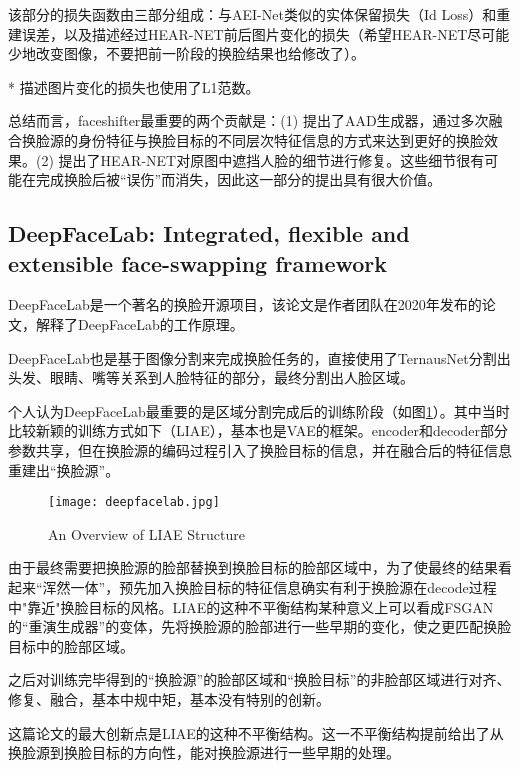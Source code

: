 \documentclass[a4paper]{article}
\begin{document}
该部分的损失函数由三部分组成：与AEI-Net类似的实体保留损失（Id Loss）和重建误差，以及描述经过HEAR-NET前后图片变化的损失（希望HEAR-NET尽可能少地改变图像，不要把前一阶段的换脸结果也给修改了）。

* 描述图片变化的损失也使用了L1范数。

\vspace{1em}
总结而言，faceshifter最重要的两个贡献是：(1) 提出了AAD生成器，通过多次融合换脸源的身份特征与换脸目标的不同层次特征信息的方式来达到更好的换脸效果。(2) 提出了HEAR-NET对原图中遮挡人脸的细节进行修复。这些细节很有可能在完成换脸后被“误伤”而消失，因此这一部分的提出具有很大价值。

\subsection{DeepFaceLab: Integrated, flexible and extensible face-swapping framework}

DeepFaceLab是一个著名的换脸开源项目，该论文是作者团队在2020年发布的论文，解释了DeepFaceLab的工作原理。

DeepFaceLab也是基于图像分割来完成换脸任务的，直接使用了TernausNet分割出头发、眼睛、嘴等关系到人脸特征的部分，最终分割出人脸区域。

个人认为DeepFaceLab最重要的是区域分割完成后的训练阶段（如图\ref{dfl}）。其中当时比较新颖的训练方式如下（LIAE），基本也是VAE的框架。encoder和decoder部分参数共享，但在换脸源的编码过程引入了换脸目标的信息，并在融合后的特征信息重建出“换脸源”。

\begin{figure}[htb]
  \centering
  \texttt{[image: deepfacelab.jpg]}
  \caption{An Overview of LIAE Structure \cite{deepfacelab}}
  \label{dfl}
\end{figure}

由于最终需要把换脸源的脸部替换到换脸目标的脸部区域中，为了使最终的结果看起来“浑然一体”，预先加入换脸目标的特征信息确实有利于换脸源在decode过程中"靠近"换脸目标的风格。LIAE的这种不平衡结构某种意义上可以看成FSGAN的“重演生成器”的变体，先将换脸源的脸部进行一些早期的变化，使之更匹配换脸目标中的脸部区域。

\vspace{1em}
之后对训练完毕得到的“换脸源”的脸部区域和“换脸目标”的非脸部区域进行对齐、修复、融合，基本中规中矩，基本没有特别的创新。

\vspace{1em}
这篇论文的最大创新点是LIAE的这种不平衡结构。这一不平衡结构提前给出了从换脸源到换脸目标的方向性，能对换脸源进行一些早期的处理。
\end{document}
